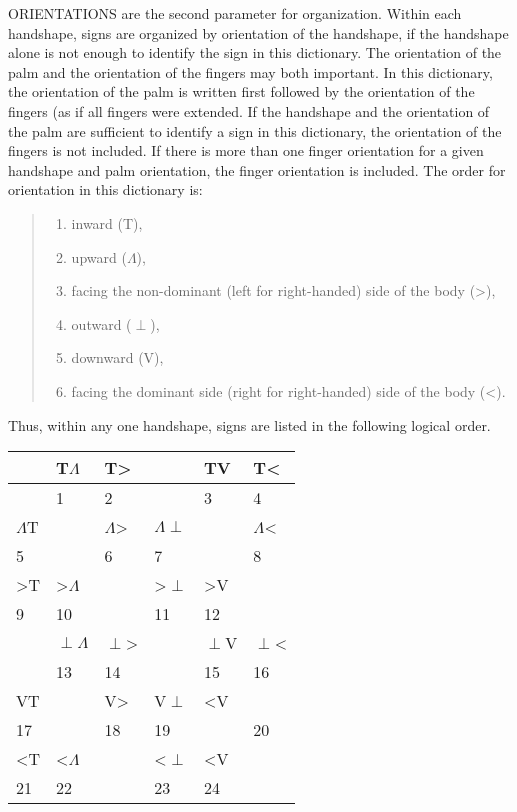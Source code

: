 \documentclass{tufte-book}
\newcommand{\sansnormal}{\sffamily\selectfont}
\begin{document}
\begin{fullwidth}
ORIENTATIONS are the second parameter for organization. Within each handshape, signs are organized by orientation of the handshape, if the handshape alone is not enough to identify the sign in this dictionary. The orientation of the palm and the orientation of the fingers may both important. In this dictionary, the orientation of the palm is written first followed by the orientation of the fingers (as if all fingers were extended. If the handshape and the orientation of the palm are sufficient to identify a sign in this dictionary, the orientation of the fingers is not included. If there is more than one finger orientation for a given handshape and palm orientation, the finger orientation is included. The order for orientation in this dictionary is:
\begin{quote}
\begin{enumerate}
\item inward ({\sansnormal T}),
\item upward ($\Lambda$),
\item facing the non-dominant (left for right-handed) side of the body (>),
\item outward ($\perp$),
\item downward ({\sansnormal V}),
\item facing the dominant side (right for right-handed) side of the body (<).
\end{enumerate}
\end{quote}

\noindent Thus, within any one handshape, signs are listed in the following logical order.

\begin{table*}[h!]
\centering
\begin{tabular}{|l | l |l | l | l | l|}
\hline
& {\sansnormal T}$\Lambda$& {\sansnormal T}> & & {\sansnormal TV} & {\sansnormal T}<\\
\hline
& 1 & 2 & &3 &4\\\hline
$\Lambda${\sansnormal T} & & $\Lambda$> & $\Lambda\perp$ & &$\Lambda$<\\
\hline
5& & 6 & 7 & &8\\\hline
>{\sansnormal T} &>$\Lambda$ & &>$\perp$&>{\sansnormal V} &\\\hline
9&10&&11&12&\\\hline
& $\perp\Lambda$ &$\perp$> & &$\perp${\sansnormal V} &$\perp$<\\\hline
& 13 & 14 & &15 &16\\\hline
{\sansnormal VT} & & {\sansnormal V}> & {\sansnormal V}$\perp$&<{\sansnormal V} & \\\hline
17 & & 18&19& & 20\\\hline
<{\sansnormal T} &<$\Lambda$& &<$\perp$&<{\sansnormal V} &\\\hline
21&22&&23&24&\\\hline
\end{tabular}
\end{table*}


\end{fullwidth}
\end{document}
